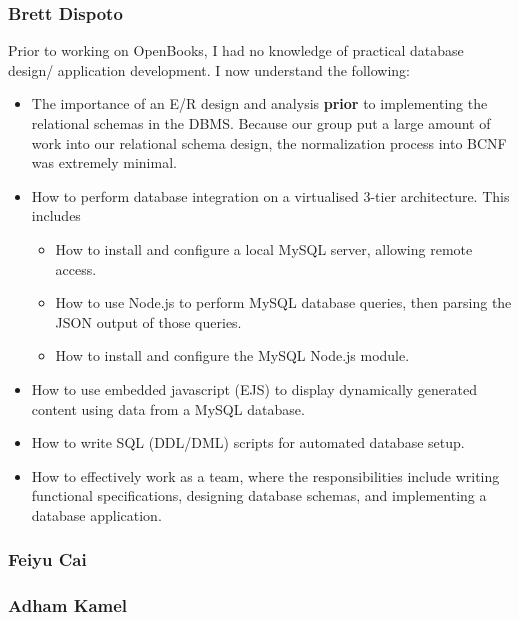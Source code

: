 \documentclass[letter, 12pt, titlepage]{article}
\begin{document}
	\subsubsection{Brett Dispoto}
		Prior to working on OpenBooks, I had no knowledge of practical database design/ application development. I now understand the following:
		\begin{itemize}
			\item The importance of an E/R design and analysis \textbf{prior} to implementing the relational schemas in the DBMS. Because our group put a large amount of work into our relational schema design, the normalization process into BCNF was extremely minimal.
			\item How to perform database integration on a virtualised 3-tier architecture. This includes 
					\begin{itemize}
						\item How to install and configure a local MySQL server, allowing remote access.
						\item How to use Node.js to perform MySQL database queries, then parsing the JSON output of those queries.
						\item How to install and configure the MySQL Node.js module.
					\end{itemize}
			\item How to use embedded javascript (EJS) to display dynamically generated content using data from a MySQL database.
			\item How to write SQL (DDL/DML) scripts for automated database setup.
			\item How to effectively work as a team, where the responsibilities include writing functional specifications,  designing database schemas, and implementing a database application.
		\end{itemize}
	\subsubsection{Feiyu Cai}

	\subsubsection{Adham Kamel}
\end{document}
